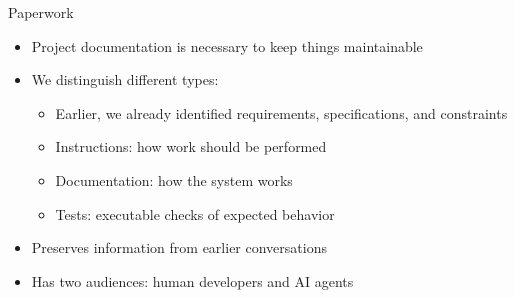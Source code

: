 \documentclass[
ps,
]{prosper}
\begin{document}
\begin{slide}{Paperwork}

\begin{itemize}

\item Project documentation is necessary to keep things maintainable

\item We distinguish different types:

  \begin{itemize}

  \item Earlier, we already identified requirements, specifications, and constraints
    
  \item Instructions: how work should be performed

  \item Documentation: how the system works

  \item Tests: executable checks of expected behavior
    
  \end{itemize}

\item Preserves information from earlier conversations

\item Has two audiences: human developers and AI agents

\end{itemize}
  
\end{slide}
\end{document}
